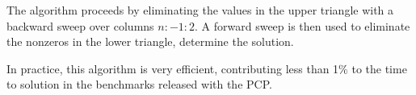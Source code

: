 The algorithm proceeds by eliminating the values in the upper triangle with a backward sweep over columns $n:-1:2$.
A forward sweep is then used to eliminate the nonzeros in the lower triangle, determine the solution.

In practice, this algorithm is very efficient, contributing less than 1\% to the time to solution in the benchmarks released with the PCP. 


